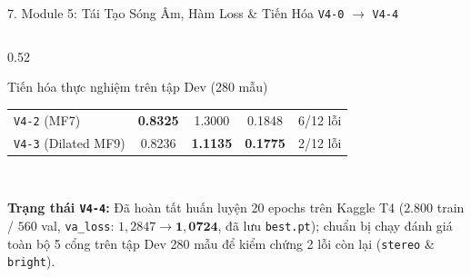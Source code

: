 \documentclass[aspectratio=169,10pt]{beamer}
\begin{document}
\begin{frame}{7. Module 5: Tái Tạo Sóng Âm, Hàm Loss \& Tiến Hóa \texttt{V4-0} $\rightarrow$ \texttt{V4-4}}
\begin{columns}[T]
\begin{column}{0.52\textwidth}
\begin{block}{Tiến hóa thực nghiệm trên tập Dev (280 mẫu)}
\begin{tabular}{lcccc}
          \texttt{V4-2} (MF7) & \textbf{0.8325} & 1.3000 & 0.1848 & 6/12 lỗi \\
          \texttt{V4-3} (Dilated MF9) & 0.8236 & \textbf{1.1135} & \textbf{0.1775} & 2/12 lỗi \\
          \bottomrule
        \end{tabular}
        \vspace{0.4em}
        \\ \raggedright
        \textbf{Trạng thái \texttt{V4-4}:} Đã hoàn tất huấn luyện 20 epochs trên Kaggle T4 ($2.800$ train / $560$ val, \texttt{va\_loss}: $1{,}2847 \rightarrow \mathbf{1{,}0724}$, đã lưu \texttt{best.pt}); chuẩn bị chạy đánh giá toàn bộ 5 cổng trên tập Dev 280 mẫu để kiểm chứng 2 lỗi còn lại (\texttt{stereo} \& \texttt{bright}).
      \end{block}
    \end{column}
  \end{columns}
\end{frame}
\end{document}
